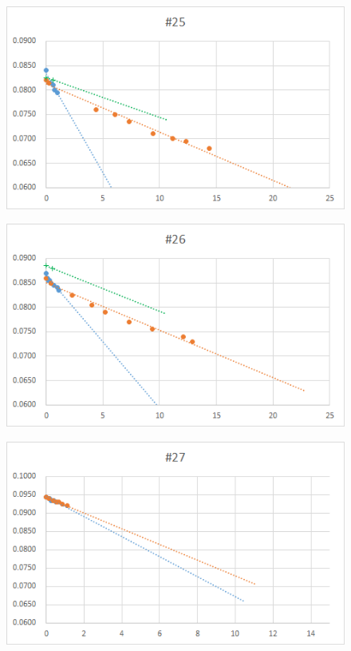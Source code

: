   \begin{figure}[htbp]
    \centering
       \includegraphics[width=120mm]{vol_025.png}
  \end{figure}
  \begin{figure}[htbp]
    \centering
       \includegraphics[width=120mm]{vol_026.png}
  \end{figure}
  \begin{figure}[htbp]
    \centering
       \includegraphics[width=120mm]{vol_027.png}
  \end{figure}
